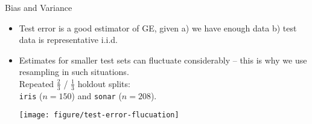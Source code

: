 \documentclass[11pt,compress,t,notes=noshow, xcolor=table]{beamer}
\begin{document}
\begin{vbframe}{Bias and Variance}

\begin{itemize}
  \item Test error is a good estimator of GE,
  given a) we have enough data b) test data is representative i.i.d.
   \item Estimates for smaller test sets can fluctuate considerably -- this is why we use resampling in such situations.\\
   Repeated $\tfrac{2}{3}$ / $\tfrac{1}{3}$ holdout splits:\\
\texttt{iris} ($n=150$) and \texttt{sonar} ($n=208$).\\

\vfill

\begin{center}
\texttt{[image: figure/test-error-flucuation]} 
\end{center}
\end{itemize}


\end{vbframe}

\end{document}

